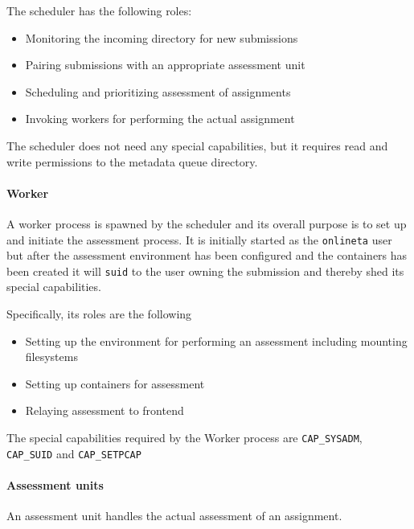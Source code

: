 The scheduler has the following roles:
\begin{itemize}
\item Monitoring the incoming directory for new submissions
\item Pairing submissions with an appropriate assessment unit
\item Scheduling and prioritizing assessment of assignments
\item Invoking workers for performing the actual assignment
\end{itemize}

The scheduler does not need any special capabilities, but it requires
read and write permissions to the metadata queue directory.


\paragraph{Worker}
A worker process is spawned by the scheduler and its overall purpose
is to set up and initiate the assessment process. It is initially
started as the \texttt{onlineta} user but after the assessment
environment has been configured and the containers has been created it
will \texttt{suid} to the user owning the submission and thereby shed its special
capabilities.

Specifically, its roles are the following
\begin{itemize}
\item Setting up the environment for performing an assessment
  including mounting filesystems
\item Setting up containers for assessment
\item Relaying assessment to frontend
\end{itemize}

The special capabilities required by the Worker process are
\texttt{CAP\_SYSADM}, \texttt{CAP\_SUID} and \texttt{CAP\_SETPCAP}

\paragraph{Assessment units}
An assessment unit handles the actual assessment of an assignment. 


